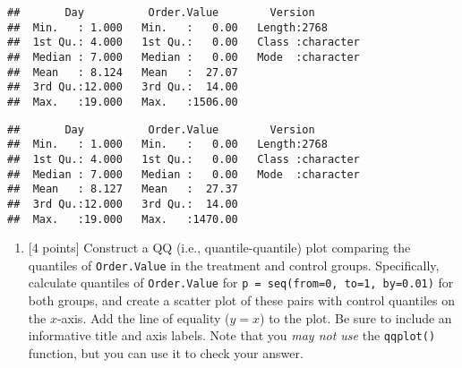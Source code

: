 \documentclass[
]{article}
\newenvironment{Shaded}{\begin{snugshade}}{\end{snugshade}}
\newcommand{\FunctionTok}[1]{\textcolor[rgb]{0.13,0.29,0.53}{\textbf{#1}}}
\newcommand{\NormalTok}[1]{#1}
\newcommand{\SpecialCharTok}[1]{\textcolor[rgb]{0.81,0.36,0.00}{\textbf{#1}}}
\newcommand{\StringTok}[1]{\textcolor[rgb]{0.31,0.60,0.02}{#1}}
\providecommand{\tightlist}{%
  \setlength{\itemsep}{0pt}\setlength{\parskip}{0pt}}
\begin{document}
\begin{verbatim}
##       Day          Order.Value        Version         
##  Min.   : 1.000   Min.   :   0.00   Length:2768       
##  1st Qu.: 4.000   1st Qu.:   0.00   Class :character  
##  Median : 7.000   Median :   0.00   Mode  :character  
##  Mean   : 8.124   Mean   :  27.07                     
##  3rd Qu.:12.000   3rd Qu.:  14.00                     
##  Max.   :19.000   Max.   :1506.00
\end{verbatim}

\begin{Shaded}
\end{Shaded}

\begin{verbatim}
##       Day          Order.Value        Version         
##  Min.   : 1.000   Min.   :   0.00   Length:2768       
##  1st Qu.: 4.000   1st Qu.:   0.00   Class :character  
##  Median : 7.000   Median :   0.00   Mode  :character  
##  Mean   : 8.127   Mean   :  27.37                     
##  3rd Qu.:12.000   3rd Qu.:  14.00                     
##  Max.   :19.000   Max.   :1470.00
\end{verbatim}

\begin{enumerate}
\def\labelenumi{(\alph{enumi})}
\setcounter{enumi}{1}
\tightlist
\item
  {[}4 points{]} Construct a QQ (i.e., quantile-quantile) plot comparing
  the quantiles of \texttt{Order.Value} in the treatment and control
  groups. Specifically, calculate quantiles of \texttt{Order.Value} for
  \texttt{p\ =\ seq(from=0,\ to=1,\ by=0.01)} for both groups, and
  create a scatter plot of these pairs with control quantiles on the
  \(x\)-axis. Add the line of equality (\(y=x\)) to the plot. Be sure to
  include an informative title and axis labels. Note that you \emph{may
  not use} the \texttt{qqplot()} function, but you can use it to check
  your answer.
\end{enumerate}
\end{document}
